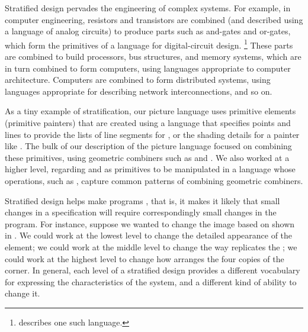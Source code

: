 Stratified design pervades the engineering of complex systems.
For example, in computer engineering, resistors and transistors are combined (and described using a language of analog circuits) to produce parts such as and-gates and or-gates, which form the primitives of a language for digital-circuit design.%
\footnote{
	 describes one such language.
}
These parts are combined to build processors, bus structures, and memory systems, which are in turn combined to form computers, using languages appropriate to computer architecture.
Computers are combined to form distributed systems, using languages appropriate for describing network interconnections, and so on.

As a tiny example of stratification, our picture language uses primitive elements (primitive painters) that are created using a language that specifies points and lines to provide the lists of line segments for , or the shading details for a painter like .
The bulk of our description of the picture language focused on combining these primitives, using geometric combiners such as  and .
We also worked at a higher level, regarding  and  as primitives to be manipulated in a language whose operations, such as , capture common patterns of combining geometric combiners.

Stratified design helps make programs , that is, it makes it likely that small changes in a specification will require correspondingly small changes in the program.
For instance, suppose we wanted to change the image based on  shown in .
We could work at the lowest level to change the detailed appearance of the  element;
we could work at the middle level to change the way  replicates the ;
we could work at the highest level to change how  arranges the four copies of the corner.
In general, each level of a stratified design provides a different vocabulary for expressing the characteristics of the system, and a different kind of ability to change it.



